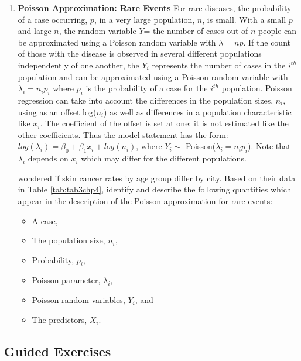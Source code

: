 \documentclass[
]{krantz}
\providecommand{\tightlist}{%
  \setlength{\itemsep}{0pt}\setlength{\parskip}{0pt}}
\begin{document}
\begin{enumerate}
\def\labelenumi{\arabic{enumi}.}
\setcounter{enumi}{15}
\item
  \textbf{Poisson Approximation: Rare Events} For rare diseases, the probability of a case occurring, \(p\), in a very large population, \(n\), is small. With a small \(p\) and large \(n\), the random variable \(Y\)= the number of cases out of \(n\) people can be approximated using a Poisson random variable with \(\lambda = np\). If the count of those with the disease is observed in several different populations independently of one another, the \(Y_i\) represents the number of cases in the \(i^{th}\) population and can be approximated using a Poisson random variable with \(\lambda_i=n_ip_i\) where \(p_i\) is the probability of a case for the \(i^{th}\) population. Poisson regression can take into account the differences in the population sizes, \(n_i\), using as an offset log(\(n_i\)) as well as differences in a population characteristic like \(x_i\). The coefficient of the offset is set at one; it is not estimated like the other coefficients. Thus the model statement has the form: \(log(\lambda_i) = \beta_0+\beta_1x_i + log(n_i)\), where \(Y_i \sim\) Poisson(\(\lambda_i = n_i p_i\)). Note that \(\lambda_i\) depends on \(x_i\) which may differ for the different populations.

  \citet{Scotto1974} wondered if skin cancer rates by age group differ by city. Based on their data in Table \ref{tab:tab3chp4}, identify and describe the following quantities which appear in the description of the Poisson approximation for rare events:

  \begin{itemize}
  \tightlist
  \item
    A case,
  \item
    The population size, \(n_i\),
  \item
    Probability, \(p_i\),
  \item
    Poisson parameter, \(\lambda_i\),
  \item
    Poisson random variables, \(Y_i\), and
  \item
    The predictors, \(X_i\).
  \end{itemize}
\end{enumerate}

\hypertarget{guided-exercises}{%
\subsection{Guided Exercises}\label{guided-exercises}}
\end{document}
